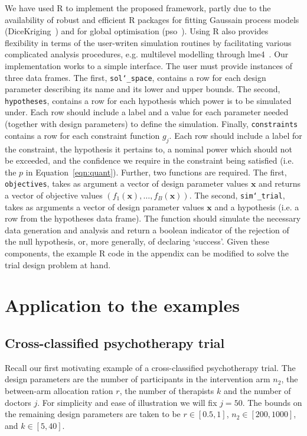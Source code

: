 \documentclass{article} %
\begin{document}
We have used R to implement the proposed framework, partly due to the availability of robust and efficient R packages for fitting Gaussain process models (DiceKriging~\cite{Roustant2012}) and for global optimisation (pso~\cite{Bendtsen2012}). Using R also provides flexibility in terms of the user-writen simulation routines by facilitating various complicated analysis procedures, e.g. multilevel modelling through lme4~\cite{Bates2015}. Our implementation works to a simple interface. The user must provide instances of three data frames. The first, \texttt{sol\char`_space}, contains a row for each design parameter describing its name and its lower and upper bounds. The second, \texttt{hypotheses}, contains a row for each hypothesis which power is to be simulated under. Each row should include a label and a value for each parameter needed (together with design parameters) to define the simulation. Finally, \texttt{constraints} contains a row for each constraint function $g_{j}$. Each row should include a label for the constraint, the hypothesis it pertains to, a nominal power which should not be exceeded, and the confidence we require in the constraint being satisfied (i.e. the $p$ in Equation~\ref{eqn:quant}). Further, two functions are required. The first, \texttt{objectives}, takes as argument a vector of design parameter values $\mathbf{x}$ and returns a vector of objective values $( f_{1}(\mathbf{x}), \ldots, f_{B}(\mathbf{x}) )$. The second, \texttt{sim\char`_trial}, takes as arguments a vector of design parameter values $\mathbf{x}$ and a hypothesis (i.e. a row from the hypotheses data frame). The function should simulate the necessary data generation and analysis and return a boolean indicator of the rejection of the null hypothesis, or, more generally, of declaring `success'. Given these components, the example R code in the appendix can be modified to solve the trial design problem at hand.

\section{Application to the examples}\label{sec:application}

\subsection{Cross-classified psychotherapy trial}

Recall our first motivating example of a cross-classified psychotherapy trial. The design parameters are the number of participants in the intervention arm $n_{2}$, the between-arm allocation ration $r$, the number of therapists $k$ and the number of doctors $j$. For simplicity and ease of illustration we will fix $j = 50$. The bounds on the remaining design parameters are taken to be $r \in [0.5, 1]$, $n_{2} \in [200, 1000]$, and $k \in [5, 40]$. 
\end{document}

